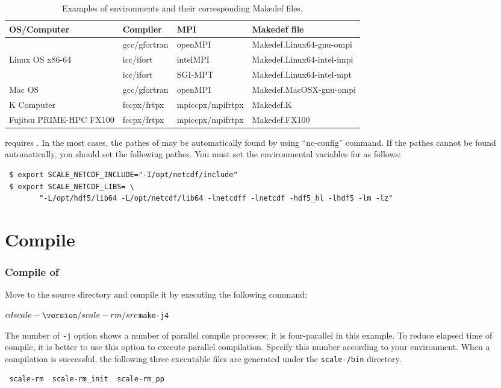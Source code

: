 \begin{table}[htb]
\begin{center}
\caption{Examples of environments and their corresponding Makedef files.}
\begin{tabularx}{150mm}{|l|l|X|l|} \hline
 \rowcolor[gray]{0.9} OS/Computer & Compiler & MPI & Makedef file \\ \hline
                 & gcc/gfortran & openMPI  & Makedef.Linux64-gnu-ompi \\ \cline{2-4}
 Linux OS x86-64 & icc/ifort    & intelMPI & Makedef.Linux64-intel-impi \\ \cline{2-4}
                 & icc/ifort    & SGI-MPT  & Makedef.Linux64-intel-mpt \\ \hline
 Mac OS          & gcc/gfortran & openMPI  & Makedef.MacOSX-gnu-ompi \\ \hline
 K Computer      & fccpx/frtpx  & mpiccpx/mpifrtpx & Makedef.K \\ \hline
 Fujitsu PRIME-HPC FX100 & fccpx/frtpx & mpiccpx/mpifrtpx & Makedef.FX100 \\ \hline
\end{tabularx}
\label{tab:makedef}
\end{center}
\end{table}


\scale requires \netcdf.
In the most cases, the pathes of \netcdf may be automatically found by using ``nc-config'' command.
If the pathes cannot be found automatically, you should set the following pathes.
You must set the environmental variables for \netcdf as follows:
\begin{verbatim}
 $ export SCALE_NETCDF_INCLUDE="-I/opt/netcdf/include"
 $ export SCALE_NETCDF_LIBS= \
        "-L/opt/hdf5/lib64 -L/opt/netcdf/lib64 -lnetcdff -lnetcdf -hdf5_hl -lhdf5 -lm -lz"
\end{verbatim}


\section{Compile} %

\subsubsection{Compile of \scalerm} %

Move to the \scalerm source directory
and compile it by executing the following command:
\begin{alltt}
 $ cd scale-{\version}/scale-rm/src
 $ make -j 4
\end{alltt}
The number of \verb|-j| option shows a number of parallel compile processes;
it is four-parallel in this example.
To reduce elapsed time of compile,
it is better to use this option to execute parallel compilation.
Specify this number according to your environment.
When a compilation is successful,
the following three executable files are generated under the \texttt{scale-{\version}/bin} directory.
\begin{verbatim}
 scale-rm  scale-rm_init  scale-rm_pp
\end{verbatim}


